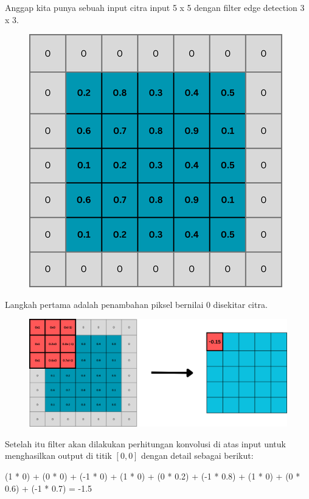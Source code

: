 \noindent Anggap kita punya sebuah input citra input 5 x 5 dengan filter edge detection 3 x 3.

\begin{figure}[H]
	\centering
	\includegraphics[scale=.4]{gambar/lampiran/padding.png}
\end{figure}

\noindent Langkah pertama adalah penambahan piksel bernilai 0 disekitar citra.


\begin{figure}[H]
	\centering
	\includegraphics[scale=.4]{gambar/lampiran/posisi-awal.png}
\end{figure}
\noindent Setelah itu filter akan dilakukan perhitungan konvolusi di atas input untuk menghasilkan output di titik \([0,0]\) dengan detail sebagai berikut: 

(1 * 0) + (0 * 0) + (-1 * 0) + (1 * 0) + (0 * 0.2) + (-1 * 0.8) + (1 * 0) + (0 * 0.6) + (-1 * 0.7) = -1.5


